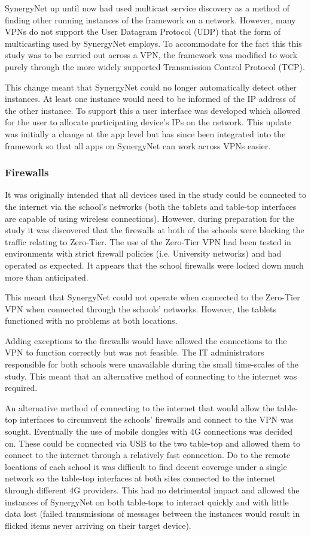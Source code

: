 \documentclass[a4paper,11pt]{article}
\begin{document}
SynergyNet up until now had used multicast service discovery as a method of finding other running instances of the framework on a network.
However, many VPNs do not support the User Datagram Protocol (UDP) that the form of multicasting used by SynergyNet employs.
To accommodate for the fact this this study was to be carried out across a VPN, the framework was modified to work purely through the more widely supported Transmission Control Protocol (TCP).

This change meant that SynergyNet could no longer automatically detect other instances.
At least one instance would need to be informed of the IP address of the other instance.
To support this a user interface was developed which allowed for the user to allocate participating device’s IPs on the network.
This update was initially a change at the app level but has since been integrated into the framework so that all apps on SynergyNet can work across VPNs easier. %

\subsubsection{Firewalls}

It was originally intended that all devices used in the study could be connected to the internet via the school’s networks (both the tablets and table-top interfaces are capable of using wireless connections).
However, during preparation for the study it was discovered that the firewalls at both of the schools were blocking the traffic relating to Zero-Tier.
The use of the Zero-Tier VPN had been tested in environments with strict firewall policies (i.e.
University networks) and had operated as expected.
It appears that the school firewalls were locked down much more than anticipated.

This meant that SynergyNet could not operate when connected to the Zero-Tier VPN when connected through the schools’ networks.
However, the tablets functioned with no problems at both locations.

Adding exceptions to the firewalls would have allowed the connections to the VPN to function correctly but was not feasible.
The IT administrators responsible for both schools were unavailable during the small time-scales of the study.
This meant that an alternative method of connecting to the internet was required.

An alternative method of connecting to the internet that would allow the table-top interfaces to circumvent the schools’ firewalls and connect to the VPN was sought.
Eventually the use of mobile dongles with 4G connections was decided on.
These could be connected via USB to the two table-top and allowed them to connect to the internet through a relatively fast connection.
Do to the remote locations of each school it was difficult to find decent coverage under a single network so the table-top interfaces at both sites connected to the internet through different 4G providers.
This had no detrimental impact and allowed the instances of SynergyNet on both table-tops to interact quickly and with little data lost (failed transmissions of messages between the instances would result in flicked items never arriving on their target device).
\end{document}
